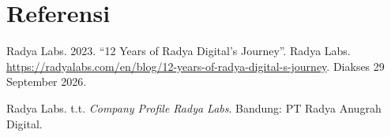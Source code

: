 \clearpage
\chapter*{Referensi}

Radya Labs. 2023. ``12 Years of Radya Digital's Journey''. Radya Labs. \url{https://radyalabs.com/en/blog/12-years-of-radya-digital-s-journey}. Diakses 29 September 2026.

Radya Labs. t.t. \textit{Company Profile Radya Labs}. Bandung: PT Radya Anugrah Digital.
